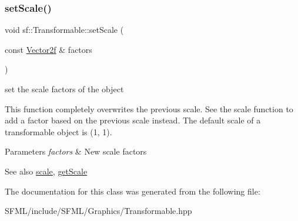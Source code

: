 \subsubsection{\texorpdfstring{setScale()}{setScale()}\hspace{0.1cm}{\footnotesize\ttfamily [2/2]}}
{\footnotesize\ttfamily void sf\+::\+Transformable\+::set\+Scale (\begin{DoxyParamCaption}\item[{const \mbox{\hyperlink{classsf_1_1_vector2}{Vector2f}} \&}]{factors }\end{DoxyParamCaption})}



set the scale factors of the object 

This function completely overwrites the previous scale. See the scale function to add a factor based on the previous scale instead. The default scale of a transformable object is (1, 1).


\begin{DoxyParams}{Parameters}
{\em factors} & New scale factors\\
\hline
\end{DoxyParams}
\begin{DoxySeeAlso}{See also}
\mbox{\hyperlink{classsf_1_1_transformable_a3de0c6d8957f3cf318092f3f60656391}{scale}}, \mbox{\hyperlink{classsf_1_1_transformable_a73819fdea80ca8a06fad8a0067b4588c}{get\+Scale}} \begin{DoxyVerb}\end{DoxyVerb}
 
\end{DoxySeeAlso}


The documentation for this class was generated from the following file\+:\begin{DoxyCompactItemize}
\item 
S\+F\+M\+L/include/\+S\+F\+M\+L/\+Graphics/Transformable.\+hpp\end{DoxyCompactItemize}
